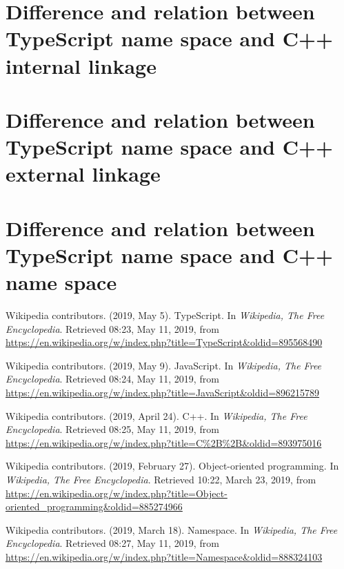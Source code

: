 \documentclass[a4paper]{report}
\begin{document}
\section{Difference and relation between TypeScript name space and C++ internal linkage}

\section{Difference and relation between TypeScript name space and C++ external linkage}

\section{Difference and relation between TypeScript name space and C++ name space}

\begin{thebibliography}{A}

Wikipedia contributors. (2019, May 5). TypeScript. In \emph{Wikipedia, The Free Encyclopedia}. Retrieved 08:23, May 11, 2019, from \url{https://en.wikipedia.org/w/index.php?title=TypeScript&oldid=895568490}

Wikipedia contributors. (2019, May 9). JavaScript. In \emph{Wikipedia, The Free Encyclopedia}. Retrieved 08:24, May 11, 2019, from \url{https://en.wikipedia.org/w/index.php?title=JavaScript&oldid=896215789}

Wikipedia contributors. (2019, April 24). C++. In \emph{Wikipedia, The Free Encyclopedia}. Retrieved 08:25, May 11, 2019, from \url{https://en.wikipedia.org/w/index.php?title=C%2B%2B&oldid=893975016}

Wikipedia contributors. (2019, February 27). Object-oriented programming. In \emph{Wikipedia, The Free Encyclopedia}. Retrieved 10:22, March 23, 2019, from \url{https://en.wikipedia.org/w/index.php?title=Object-oriented_programming&oldid=885274966}

Wikipedia contributors. (2019, March 18). Namespace. In \emph{Wikipedia, The Free Encyclopedia}. Retrieved 08:27, May 11, 2019, from \url{https://en.wikipedia.org/w/index.php?title=Namespace&oldid=888324103}
\end{thebibliography}
\end{document}
